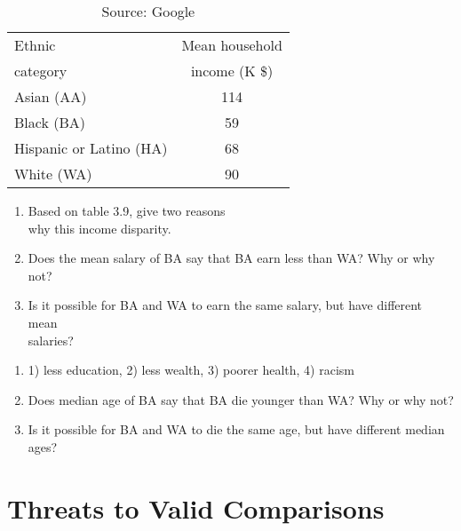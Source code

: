 \documentclass[11pt]{book}\usepackage[]{graphicx}\usepackage[]{color}
\begin{document}
\begin{exercises}
\begin{exercise}
\begin{table}[ht]
 \centering
	\caption{Source: Google}
 \begin{tabular}{@{} lc @{}}
  Ethnic 	& Mean household \\ 
  category & income (K \$) \\ \hline
  Asian (AA) & 114 \\
  Black (BA) & 59 \\
  Hispanic or Latino (HA) & 68 \\
  White (WA) & 90 \\
    \hline
 \end{tabular}
   \label{tab:t3_16}
 \end{table}

\begin{enumerate}
\item Based on  table 3.9, give two reasons \\ why this income disparity.
\item Does the mean salary of BA say that BA earn less than WA? Why or why not?
\item Is it possible for BA and WA to earn the same salary, but have different mean \\ salaries?
\end{enumerate}

\end{exercise}
\begin{solution}  %

\begin{enumerate}
\item   1) less education, 2) less wealth, 3) poorer health, 4) racism 
\item Does median age of BA say that BA die younger than WA? Why or why not?  
\item Is it possible for BA and WA to die the same age, but have different median \\ ages?
\end{enumerate}
\end{solution}



\end{exercises}

\onecolumn



\chapter{Threats to Valid Comparisons}
\label{chap:ch4}
\end{document}
